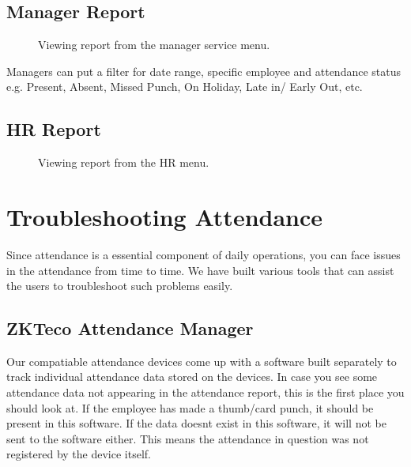 \documentclass[letterpaper,10pt,english]{sphinxmanual}
\begin{document}
\subsection{Manager Report}
\label{\detokenize{attendance/report:manager-report}}\label{\detokenize{attendance/report:manager-attendance-report}}
\begin{figure}[htbp]
\centering
\capstart

\noindent{}
\caption{Viewing report from the manager service menu.}\label{\detokenize{attendance/report:id2}}\end{figure}

Managers can put a filter for date range, specific employee and attendance status e.g. Present, Absent, Missed Punch, On Holiday, Late in/ Early Out, etc.


\subsection{HR Report}
\label{\detokenize{attendance/report:hr-report}}
\begin{figure}[htbp]
\centering
\capstart

\noindent{}
\caption{Viewing report from the HR menu.}\label{\detokenize{attendance/report:id3}}\end{figure}


\section{Troubleshooting Attendance}
\label{\detokenize{attendance/troubleshooting:troubleshooting-attendance}}\label{\detokenize{attendance/troubleshooting::doc}}\label{\detokenize{attendance/troubleshooting:attendance-troubleshooting}}
Since attendance is a essential component of daily operations, you can face issues in the attendance from time to time. We have built various tools that can assist the users to troubleshoot such problems easily.


\subsection{ZKTeco Attendance Manager}
\label{\detokenize{attendance/troubleshooting:zkteco-attendance-manager}}
Our compatiable attendance devices come up with a software built separately to track individual attendance data stored on the devices. In case you see some attendance data not appearing in the attendance report, this is the first place you should look at. If the employee has made a thumb/card punch, it should be present in this software. If the data doesnt exist in this software, it will not be sent to the software either. This means the attendance in question was not registered by the device itself.
\end{document}
